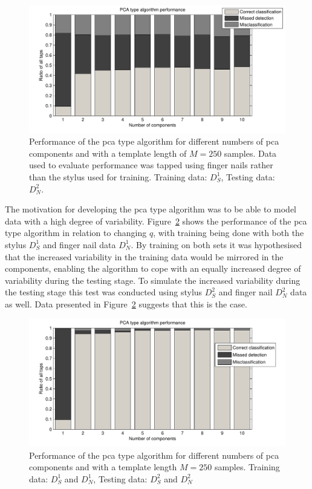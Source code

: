 \begin{figure}[!] %
\centering
\includegraphics[width=150mm]{PCAperformNail.pdf}
\caption{Performance of the \gls{pca} type algorithm for different numbers of \gls{pca} components and with a template length of $M=250$ samples. Data used to evaluate performance was tapped using finger nails rather than the stylus used for training. Training data: $D^1_S$, Testing data: $D^2_N$.}\label{fig:PCAperformNail}
\end{figure}

The motivation for developing the \gls{pca} type algorithm was to be able to model data with a high degree of variability. Figure~\ref{fig:PCAperform_SN-SN} shows the performance of the \gls{pca} type algorithm in relation to changing $q$, with training being done with both the stylus $D^1_S$ and finger nail data $D^1_N$. By training on both sets it was hypothesised that the increased variability in the training data would be mirrored in the components, enabling the algorithm to cope with an equally increased degree of variability during the testing stage. To simulate the increased variability during the testing stage this test was conducted using stylus $D^2_S$ and finger nail $D^2_N$ data as well. Data presented in Figure~\ref{fig:PCAperform_SN-SN} suggests that this is the case.

\begin{figure}[!] %
\centering
\includegraphics[width=150mm]{PCAperform_SN-SN.pdf}
\caption{Performance of the \gls{pca} type algorithm for different numbers of \gls{pca} components and with a template length $M=250$ samples. Training data: $D^1_S$ and $D^1_N$, Testing data: $D^2_S$ and $D^2_N$}\label{fig:PCAperform_SN-SN}
\end{figure}

